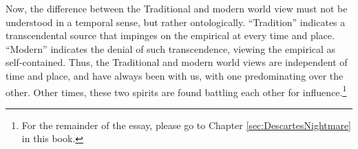 Now, the difference between the Traditional and modern world view must not be understood in a temporal sense, but rather ontologically. ``Tradition'' indicates a transcendental source that impinges on the empirical at every time and place. ``Modern'' indicates the denial of such transcendence, viewing the empirical as self-contained. Thus, the Traditional and modern world views are independent of time and place, and have always been with us, with one predominating over the other. Other times, these two spirits are found battling each other for influence.\footnote{For the remainder of the essay, please go to Chapter \ref{sec:DescartesNightmare} in this book.}



